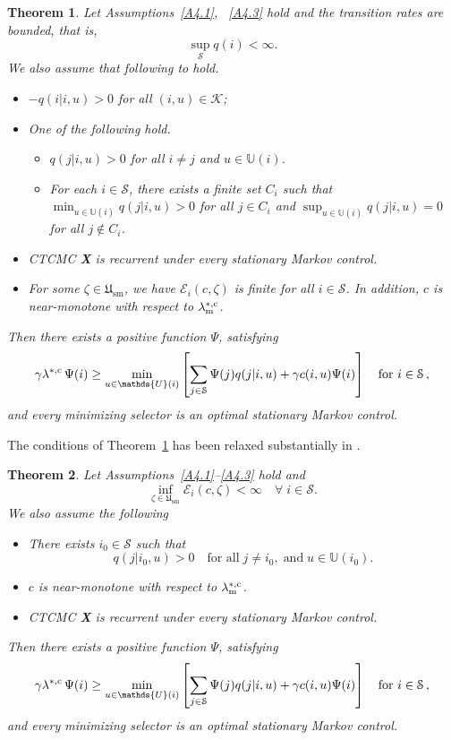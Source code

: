 \documentclass[notitlepage,11pt,reqno]{amsart}
\numberwithin{equation}{section}
\theoremstyle{plain}
\newtheorem{theorem}{Theorem}[section]
\theoremstyle{definition}
\theoremstyle{remark}
\newcommand{\Act}{{\mathds{U}}}
\newcommand{\sE}{{\mathscr{E}}}     %
\newcommand{\sK}{{\mathscr{K}}}
\newcommand{\cS}{{\mathcal{S}}}     %
\newcommand{\Usm}{\mathfrak{U}_{\mathrm{sm}}}
\newcommand{\lamstrcm}{\lambda^{*,{\rm c}}}
\begin{document}
\begin{theorem}\label{T4.5}
Let Assumptions~\ref{A4.1}, ~\ref{A4.3} hold and the transition rates are bounded, that is, 
$$\sup_{\cS} q(i)<\infty.$$
We also assume that following to hold.
\begin{itemize}
\item[(i)] $-q(i|i, u)>0$ for all $(i, u)\in\sK$;
\item[(ii)] One of the following hold.
\begin{itemize}
\item[(a)] $q(j|i, u)>0$ for all $i\neq j$ and $u\in\Act(i)$.
\item[(b)] For each $i\in \cS$, there exists a finite set $C_i$ such that $\min_{u\in\Act(i)} q(j|i, u)>0$ for all $j\in C_i$ and $\sup_{u\in\Act(i)}q(j|i, u)=0$ for all $j\notin C_i$.
\end{itemize}
\item[(iii)] CTCMC \textbf{X} is recurrent under every stationary Markov control.
\item[(iv)] For some $\zeta\in\Usm$, we have $\sE_i(c, \zeta)$ is finite for all $i\in\cS$. In addition, $c$ is near-monotone with respect to $\lambda^{*,{\rm c}}_{\rm m}$.
\end{itemize}
Then there exists a positive function $\Psi$, satisfying
\begin{equation*}
\gamma\lamstrcm\,\Psi(i) \geq \min_{u\in\Act(i)}\left[\sum_{j\in \cS} \Psi(j)q(j|i,u) + \gamma c(i, u)\Psi(i)\right]\quad\text{for}\,\, i\in \cS\,,
\end{equation*}
and every minimizing selector is an optimal stationary Markov control.
\end{theorem}
The conditions of Theorem~\ref{T4.5} has been relaxed substantially in \cite[Theorem~3.2]{MR4429406}. 
\begin{theorem}\label{T4.6}
Let Assumptions~\ref{A4.1}--\ref{A4.3} hold and 
$$\inf_{\zeta\in\Usm}\sE_i(c, \zeta)<\infty\quad \forall \; i\in\cS.$$
We also assume the following
\begin{itemize}
\item[(i)] There exists $i_0\in \cS$ such that 
\begin{equation*}
q(j|i_0,u) > 0\quad \text{for all} \; j\neq i_0, \; \text{and}\; u\in\Act(i_0).
\end{equation*}
\item[(ii)] $c$ is near-monotone with respect to $\lambda^{*,{\rm c}}_{\rm m}$.
\item[\hypertarget{T4.6c}{(iii)}] CTCMC \textbf{X} is recurrent under every stationary Markov control.
\end{itemize}
Then there exists a positive function $\Psi$, satisfying
\begin{equation*}
\gamma\lamstrcm\,\Psi(i) \geq \min_{u\in\Act(i)}\left[\sum_{j\in \cS} \Psi(j)q(j|i,u) + \gamma c(i, u)\Psi(i)\right]\quad\text{for}\,\, i\in \cS\,,
\end{equation*}
and every minimizing selector is an optimal stationary Markov control.
\end{theorem}
\end{document}
